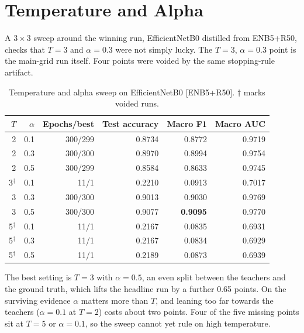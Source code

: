 \documentclass[10pt,letterpaper]{article}
\begin{document}
\section{Temperature and Alpha}
\label{sec:sweep}
A $3\times3$ sweep around the winning run, EfficientNetB0 distilled from ENB5+R50, checks that $T=3$ and
$\alpha=0.3$ were not simply lucky. The $T=3$, $\alpha=0.3$ point is the main-grid run itself. Four points
were voided by the same stopping-rule artifact.

\begin{table}[H]
\centering
\small
\caption{Temperature and alpha sweep on EfficientNetB0 [ENB5+R50]. $\dagger$ marks voided runs.}
\begin{tabular}{@{}rrrrrr@{}}
\toprule
$T$ & $\alpha$ & Epochs/best & Test accuracy & Macro F1 & Macro AUC \\
\midrule
2 & 0.1 & 300/299 & 0.8734 & 0.8772 & 0.9719 \\
2 & 0.3 & 300/300 & 0.8970 & 0.8994 & 0.9754 \\
2 & 0.5 & 300/299 & 0.8584 & 0.8633 & 0.9745 \\
3$^\dagger$ & 0.1 & 11/1 & 0.2210 & 0.0913 & 0.7017 \\
3 & 0.3 & 300/300 & 0.9013 & 0.9030 & 0.9769 \\
3 & 0.5 & 300/300 & 0.9077 & \textbf{0.9095} & 0.9770 \\
5$^\dagger$ & 0.1 & 11/1 & 0.2167 & 0.0835 & 0.6931 \\
5$^\dagger$ & 0.3 & 11/1 & 0.2167 & 0.0834 & 0.6929 \\
5$^\dagger$ & 0.5 & 11/1 & 0.2189 & 0.0873 & 0.6939 \\
\bottomrule
\end{tabular}
\end{table}

The best setting is $T=3$ with $\alpha=0.5$, an even split between the teachers and the ground truth, which
lifts the headline run by a further 0.65 points. On the surviving evidence $\alpha$ matters more than $T$,
and leaning too far towards the teachers ($\alpha=0.1$ at $T=2$) costs about two points. Four of the five
missing points sit at $T=5$ or $\alpha=0.1$, so the sweep cannot yet rule on high temperature.
\end{document}
